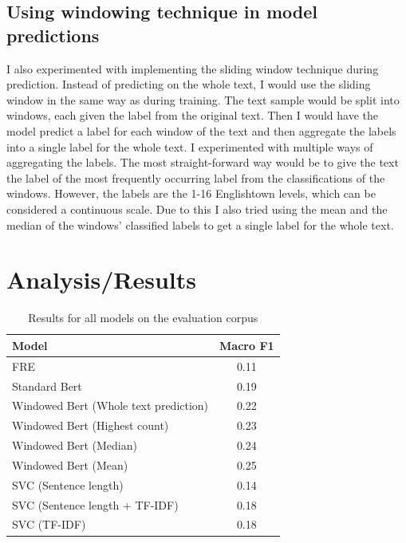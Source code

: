 \documentclass[11pt,a4paper]{article}
\begin{document}
\subsection{Using windowing technique in model predictions}

I also experimented with implementing the sliding window technique during prediction.
Instead of predicting on the whole text, I would use the sliding window in the same way
as during training. The text sample would be split into windows, each given the label
from the original text. Then I would have the model predict a label for
each window of the text and then aggregate the labels into a single label
for the whole text. I experimented with multiple ways of aggregating the
labels. The most straight-forward way would be to give the
text the label of the most frequently occurring label from the classifications
of the windows. However, the labels are the 1-16 Englishtown levels, which can
be considered a continuous scale. Due to this I also tried using the mean and
the median of the windows' classified labels to get a single label for the
whole text.

\section{Analysis/Results}

\begin{table}
  \centering
  \begin{tabular}{l|c}
    \toprule
    Model & Macro F1\\
    \midrule
    FRE & 0.11\\
    \midrule
    Standard Bert & 0.19\\
    \midrule
    Windowed Bert (Whole text prediction) & 0.22\\
    \midrule
    Windowed Bert (Highest count) & 0.23\\
    \midrule
    Windowed Bert (Median) & 0.24\\
    \midrule
    Windowed Bert (Mean) & 0.25\\
    \midrule
    SVC (Sentence length) & 0.14\\
    \midrule
    SVC (Sentence length + TF-IDF) & 0.18\\
    \midrule
    SVC (TF-IDF) & 0.18\\
    \bottomrule
  \end{tabular}
  \caption{Results for all models on the evaluation corpus}
  \label{tab:results}
\end{table}
\end{document}
